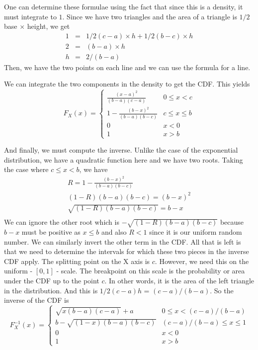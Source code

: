 \documentclass{article}
\begin{document}
One can determine these formulae using
the fact that since this is a density, it 
must integrate to $1$. Since we have two triangles
and the area of a triangle is 
$1/2$ base $\times$ height, we get
\begin{eqnarray*}
 1 & = & 1/2 (c-a)\times h + 1/2 (b-c) \times h \\
 2 &=& (b-a) \times h \\
 h &=& 2/(b-a)
\end{eqnarray*}
Then, we have the two points on each line
and we can use the formula for a line.


We can integrate the two components
in the density to get the CDF.
This yields
$$
  F_X(x) = 
  \begin{cases}
  \frac{(x - a)^2}{(b-a)(c-a)} & 0 \le x < c\\
                  1 - \frac{(b -x)^2}{(b-a)(b-c)} & c \le x \le b \\
                  0 & x < 0 \\
                  1 & x > b
  \end{cases}
$$

And finally, we must compute the inverse.  Unlike the case of the
exponential distribution, we have a quadratic function here and we
have two roots.
Taking the case where $c \le x < b$, we have
\begin{eqnarray*}
  R = 1 - \frac{(b-x)^2}{(b-a)(b-c)} \\
  (1 - R)(b-a)(b-c) = (b-x)^2 \\
  \sqrt{(1 - R)(b-a)(b-c)} = b - x \\
\end{eqnarray*}
We can ignore the other root which is $-\sqrt{(1 - R)(b-a)(b-c)}$
because $b - x$ must be positive as $x \le b$ and also $R < 1$ since
it is our uniform random number.  We can similarly invert the other
term in the CDF.  All that is left is that we need to determine the
intervals for which these two pieces in the inverse CDF apply.  The
splitting point on the X axis is $c$.  However, we need this on the
uniform - $[0,1]$ - scale.  The breakpoint on this scale is the
probability or area under the CDF up to the point $c$.
In other words, it is the area of the left triangle in 
the distribution. And this is
$1/2 (c-a) h$  = $(c-a)/(b-a)$. So the 
inverse of the CDF is 
$$
  F^{-1}_X(x) =
  \begin{cases}
    \sqrt{x(b-a)(c-a)} + a &  0 \le x < (c-a)/(b-a)\\
    b - \sqrt{(1 - x)(b-a)(b-c)} & (c-a)/(b-a) \le x \le 1 \\
    0 & x < 0 \\
    1 & x > b
  \end{cases}
$$
\end{document}
